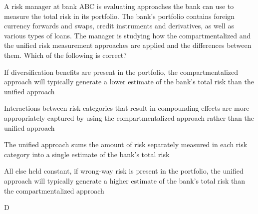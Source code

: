 \documentclass{article}
\newcounter{question} %
\begin{document}
\begin{question}
    A risk manager at bank ABC is evaluating approaches the bank can use to measure the total risk in its portfolio. The bank's portfolio contains foreign currency forwards and swaps, credit instruments and derivatives, as well as various types of loans. The manager is studying how the compartmentalized and the unified risk measurement approaches are applied and the differences between them. Which of the following is correct?
\end{question}

\begin{choices}
    \item If diversification benefits are present in the portfolio, the compartmentalized approach will typically generate a lower estimate of the bank's total risk than the unified approach
    \item Interactions between risk categories that result in compounding effects are more appropriately captured by using the compartmentalized approach rather than the unified approach
    \item The unified approach sums the amount of risk separately measured in each risk category into a single estimate of the bank's total risk
    \item All else held constant, if wrong-way risk is present in the portfolio, the unified approach will typically generate a higher estimate of the bank's total risk than the compartmentalized approach
\end{choices}

\begin{correctanswer}
    D
\end{correctanswer}
\end{document}
